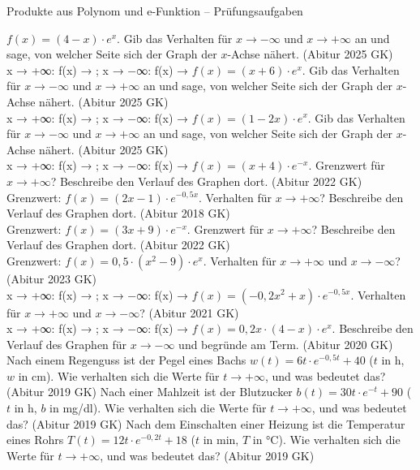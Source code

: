 \begin{aufgabe}{Produkte aus Polynom und e-Funktion – Prüfungsaufgaben}
\begin{teile}
\teil $f(x) = (4 - x) \cdot e^{x}$. Gib das Verhalten für $x \to -\infty$ und $x \to +\infty$ an und sage, von welcher Seite sich der Graph der $x$-Achse nähert. \hfill (Abitur 2025 GK) \\ x → +∞: f(x) → \leerfeld ; x → −∞: f(x) → \leerfeld
\teil $f(x) = (x + 6) \cdot e^{x}$. Gib das Verhalten für $x \to -\infty$ und $x \to +\infty$ an und sage, von welcher Seite sich der Graph der $x$-Achse nähert. \hfill (Abitur 2025 GK) \\ x → +∞: f(x) → \leerfeld ; x → −∞: f(x) → \leerfeld
\teil $f(x) = (1 - 2x) \cdot e^{x}$. Gib das Verhalten für $x \to -\infty$ und $x \to +\infty$ an und sage, von welcher Seite sich der Graph der $x$-Achse nähert. \hfill (Abitur 2025 GK) \\ x → +∞: f(x) → \leerfeld ; x → −∞: f(x) → \leerfeld
\teil $f(x) = (x + 4) \cdot e^{-x}$. Grenzwert für $x \to +\infty$? Beschreibe den Verlauf des Graphen dort. \hfill (Abitur 2022 GK) \\ Grenzwert: \leerfeld
\teil $f(x) = (2x - 1) \cdot e^{-0{,}5x}$. Verhalten für $x \to +\infty$? Beschreibe den Verlauf des Graphen dort. \hfill (Abitur 2018 GK) \\ Grenzwert: \leerfeld
\teil $f(x) = (3x + 9) \cdot e^{-x}$. Grenzwert für $x \to +\infty$? Beschreibe den Verlauf des Graphen dort. \hfill (Abitur 2022 GK) \\ Grenzwert: \leerfeld
\teil $f(x) = 0{,}5 \cdot (x^2 - 9) \cdot e^{x}$. Verhalten für $x \to +\infty$ und $x \to -\infty$? \hfill (Abitur 2023 GK) \\ x → +∞: f(x) → \leerfeld ; x → −∞: f(x) → \leerfeld
\teil $f(x) = (-0{,}2x^2 + x) \cdot e^{-0{,}5x}$. Verhalten für $x \to +\infty$ und $x \to -\infty$? \hfill (Abitur 2021 GK) \\ x → +∞: f(x) → \leerfeld ; x → −∞: f(x) → \leerfeld
\teil $f(x) = 0{,}2x \cdot (4 - x) \cdot e^{x}$. Beschreibe den Verlauf des Graphen für $x \to -\infty$ und begründe am Term. \hfill (Abitur 2020 GK)
\teil Nach einem Regenguss ist der Pegel eines Bachs $w(t) = 6t \cdot e^{-0{,}5t} + 40$ ($t$ in h, $w$ in cm). Wie verhalten sich die Werte für $t \to +\infty$, und was bedeutet das? \hfill (Abitur 2019 GK)
\teil Nach einer Mahlzeit ist der Blutzucker $b(t) = 30t \cdot e^{-t} + 90$ ($t$ in h, $b$ in mg/dl). Wie verhalten sich die Werte für $t \to +\infty$, und was bedeutet das? \hfill (Abitur 2019 GK)
\teil Nach dem Einschalten einer Heizung ist die Temperatur eines Rohrs $T(t) = 12t \cdot e^{-0{,}2t} + 18$ ($t$ in min, $T$ in °C). Wie verhalten sich die Werte für $t \to +\infty$, und was bedeutet das? \hfill (Abitur 2019 GK)
\end{teile}
\end{aufgabe}

